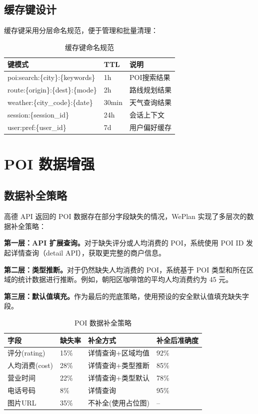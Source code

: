 \documentclass[12pt,a4paper]{ctexart}
\begin{document}
\subsection{缓存键设计}

缓存键采用分层命名规范，便于管理和批量清理：

\begin{table}[H]
\centering
\caption{缓存键命名规范}
\label{tab:cache-keys}
\renewcommand{\arraystretch}{1.3}
{\small
\begin{tabular}{p{5cm} p{2cm} p{5cm}}
\toprule
\textbf{键模式} & \textbf{TTL} & \textbf{说明} \\
\midrule
poi:search:\{city\}:\{keywords\} & 1h & POI搜索结果 \\
route:\{origin\}:\{dest\}:\{mode\} & 2h & 路线规划结果 \\
weather:\{city\_code\}:\{date\} & 30min & 天气查询结果 \\
session:\{session\_id\} & 24h & 会话上下文 \\
user:pref:\{user\_id\} & 7d & 用户偏好缓存 \\
\bottomrule
\end{tabular}
}
\end{table}

\section{POI 数据增强}

\subsection{数据补全策略}

高德 API 返回的 POI 数据存在部分字段缺失的情况，WePlan 实现了多层次的数据补全策略：

\textbf{第一层：API 扩展查询。}对于缺失评分或人均消费的 POI，系统使用 POI ID 发起详情查询（detail API），获取更完整的商户信息。

\textbf{第二层：类型推断。}对于仍然缺失人均消费的 POI，系统基于 POI 类型和所在区域的统计数据进行推断。例如，朝阳区咖啡馆的平均人均消费约为 45 元。

\textbf{第三层：默认值填充。}作为最后的兜底策略，使用预设的安全默认值填充缺失字段。

\begin{table}[H]
\centering
\caption{POI 数据补全策略}
\label{tab:poi-enhancement}
\renewcommand{\arraystretch}{1.3}
{\small
\begin{tabular}{p{3cm} p{2.5cm} p{3cm} p{3.5cm}}
\toprule
\textbf{字段} & \textbf{缺失率} & \textbf{补全方式} & \textbf{补全后准确度} \\
\midrule
评分(rating) & 15\% & 详情查询+区域均值 & 92\% \\
人均消费(cost) & 28\% & 详情查询+类型推断 & 85\% \\
营业时间 & 22\% & 详情查询+类型默认 & 78\% \\
电话号码 & 8\% & 详情查询 & 95\% \\
图片URL & 35\% & 不补全(使用占位图) & -- \\
\bottomrule
\end{tabular}
}
\end{table}
\end{document}

